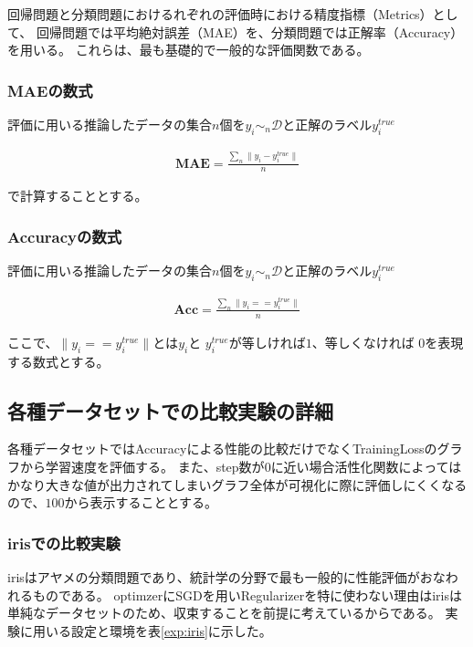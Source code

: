 回帰問題と分類問題におけるれぞれの評価時における精度指標（Metrics）として、
回帰問題では平均絶対誤差（MAE）を、分類問題では正解率（Accuracy）を用いる。
これらは、最も基礎的で一般的な評価関数である。


\subsubsection{MAEの数式}


評価に用いる推論したデータの集合$n$個を$ y_i \sim_n \mathcal{D}$と正解のラベル$ y_i^{true} $

\begin{eqnarray}
\mathbf{MAE} = \frac{\sum_n \|y_i - y_i^{true}\|}{n}
\label{eq:accuracy}
\end{eqnarray}

で計算することとする。


\subsubsection{Accuracyの数式}

評価に用いる推論したデータの集合$n$個を$ y_i \sim_n \mathcal{D}$と正解のラベル$ y_i^{true} $

\begin{eqnarray}
\mathbf{Acc} = \frac{\sum_n \|y_i == y_i^{true}\|}{n}
\label{eq:accuracy}
\end{eqnarray}

ここで、$ \|y_i == y_i^{true}\| $とは$ y_i $と $ y_i^{true} $が等しければ$ 1 $、等しくなければ $ 0 $を表現する数式とする。

\subsection{各種データセットでの比較実験の詳細}

各種データセットではAccuracyによる性能の比較だけでなくTrainingLossのグラフから学習速度を評価する。
また、step数が$0$に近い場合活性化関数によってはかなり大きな値が出力されてしまいグラフ全体が可視化に際に評価しにくくなるので、$100$から表示することとする。

\subsubsection{irisでの比較実験}
\label{impl:iris}

irisはアヤメの分類問題であり、統計学の分野で最も一般的に性能評価がおなわれるものである。
optimzerにSGDを用いRegularizerを特に使わない理由はirisは単純なデータセットのため、収束することを前提に考えているからである。
実験に用いる設定と環境を表\ref{exp:iris}に示した。


